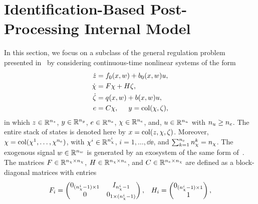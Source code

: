 \section{Identification-Based Post-Processing Internal Model}
\label{SEC:POST-PROCESSING}
In this section, we focus on a subclass of the general regulation problem presented in~
by considering continuous-time nonlinear systems of the form
\begin{equation}%
   \label{EQ:POSTP-FRAMEWORK}
   \begin{split}
      \dot{\zz} &= \zfun(\xx ,\ww) + \zin(\xx, \ww) \uu, \\
      \dot{\chain} &= F \chain + H \last, \\
      \dot{\last} &= \qfun(\xx ,\ww) + \bfun(\xx ,\ww) \uu, \\
      \ee &= C \chain, \hspace{0.5cm} \yy = \text{col}(\chain, \last),
   \end{split}
\end{equation}
in which $z \in \mathbb{R}^{n_{z}}$, $y \in \mathbb{R}^{n_{y}}$, $e \in \mathbb{R}^{n_{e}}$, $\chi \in \mathbb{R}^{n_{e}}$, and,
$u \in \mathbb{R}^{n_{u}}$ with $n_{u} \ge n_{e}$. The entire stack of states is denoted here by $x = \text{col}(z, \chi, \zeta)$.
Moreover, $\chi = \text{col}(\chi^1, \dots, \chi^{n_{e}})$, with $\chi^i \in \mathbb{R}^{n_{\chi}^i}$, $i = 1, \dots, \dd{\ee}$,
and $\sum_{k=1}^{n_{e}} n_{\chi}^k = n_{\chi}$. The exogenous signal $w \in \mathbb{R}^{n_{w}}$ is generated by an exosystem
of the same form of~. The matrices $F \in \mathbb{R}^{n_{\chi} \times n_{\chi}}$,
$H \in \mathbb{R}^{n_{\chi} \times n_{e}}$, and $C \in \mathbb{R}^{n_{e} \times n_{\chi}}$ are defined as a block-diagonal matrices with entries
\begin{equation*}
   \begin{matrix}
      F_i =
      \begin{pmatrix}
         0_{(n_{\chi}^i-1) \times 1} & I_{n_{\chi}^i - 1} \\
         0 & 0_{1 \times (n_{\chi}^i-1)}
      \end{pmatrix}, &
      H_i =
      \begin{pmatrix}
         0_{(n_{\chi}^i-1) \times 1} \\ 1
      \end{pmatrix},
   \end{matrix}
\end{equation*}
